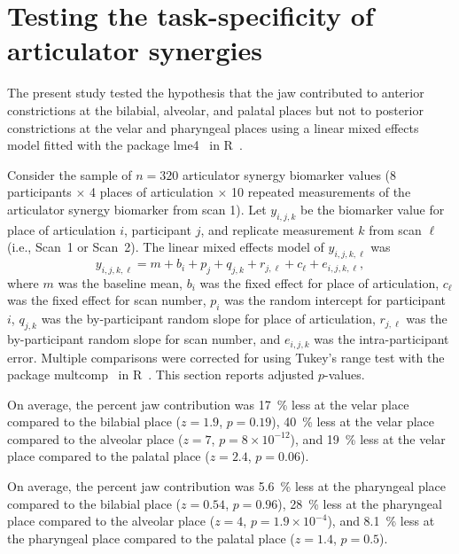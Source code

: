 \documentclass[preprint]{JASAnew}\usepackage[]{graphicx}\usepackage[]{color}
\begin{document}
\section{Testing the task-specificity of articulator synergies}
\label{sec:taskspec}

The present study tested the hypothesis that the jaw contributed to anterior constrictions at the bilabial, alveolar, and palatal places but not to posterior constrictions at the velar and pharyngeal places using a linear mixed effects model fitted with the package lme4~\citep{bates2015fitting} in R~\citep{r2017language}. 


Consider the sample of $n=320$ articulator synergy biomarker values (\num{8} participants $\times$ \num{4} places of articulation $\times$ \num{10} repeated measurements of the articulator synergy biomarker from scan \num{1}). Let $y_{i,j,k}$ be the biomarker value for place of articulation $i$, participant $j$, and replicate measurement $k$ from scan $\ell$ (i.e., Scan~\num{1} or Scan~\num{2}). The linear mixed effects model of $y_{i,j,k,\ell}$ was 
%
\begin{equation}
y_{i,j,k,\ell} = m + b_i + p_j + q_{j,k} + r_{j,\ell} + c_\ell + e_{i,j,k,\ell},
\end{equation}
%
where $m$ was the baseline mean, $b_i$ was the fixed effect for place of articulation, $c_\ell$ was the fixed effect for scan number, $p_i$ was the random intercept for participant $i$, $q_{j,k}$ was the by-participant random slope for place of articulation, $r_{j,\ell}$ was the by-participant random slope for scan number, and $e_{i,j,k}$ was the intra-participant error. Multiple comparisons were corrected for using Tukey's range test with the package multcomp~\citep{hothorn2008simultaneous} in R~\citep{r2017language}. This section reports adjusted $p$-values. 

%
On average, the percent jaw contribution was 
%
%
\SI{17}{\percent} 
less at the velar place compared to the bilabial place
($z=1.9$, 
$p=0.19$),
%
%
\SI{40}{\percent} 
less at the velar place compared to the alveolar place
($z=7$, 
$p=\ensuremath{8\times 10^{-12}}$), and
%
%
\SI{19}{\percent} 
less at the velar place compared to the palatal place
($z=2.4$, 
$p=0.06$).




%
On average, the percent jaw contribution was 
%
%
\SI{5.6}{\percent} 
less at the pharyngeal place compared to the bilabial place
($z=0.54$, 
$p=0.96$),
%
%
\SI{28}{\percent} 
less at the pharyngeal place compared to the alveolar place
($z=4$, 
$p=\ensuremath{1.9\times 10^{-4}}$), and
%
%
\SI{8.1}{\percent} 
less at the pharyngeal place compared to the palatal place
($z=1.4$, 
$p=0.5$).
\end{document}
